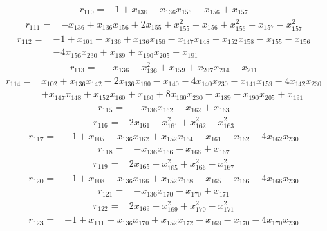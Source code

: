\[\begin{aligned}
r_{110}={}&1+x_{136}-x_{136}x_{156}-x_{156}+x_{157}
\end{aligned}\]
\[\begin{aligned}
r_{111}={}&-x_{136}+x_{136}x_{156}+2x_{155}+x_{155}^{2}-x_{156}+x_{156}^{2}-x_{157}-x_{157}^{2}
\end{aligned}\]
\[\begin{aligned}
r_{112}={}&-1+x_{101}-x_{136}+x_{136}x_{156}-x_{147}x_{148}+x_{152}x_{158}-x_{155}-x_{156}
\\ &-4x_{156}x_{230}+x_{189}+x_{190}x_{205}-x_{191}
\end{aligned}\]
\[\begin{aligned}
r_{113}={}&-x_{136}-x_{136}^{2}+x_{159}+x_{207}x_{214}-x_{211}
\end{aligned}\]
\[\begin{aligned}
r_{114}={}&x_{102}+x_{136}x_{142}-2x_{136}x_{160}-x_{140}-4x_{140}x_{230}-x_{141}x_{159}-4x_{142}x_{230}
\\ &+x_{147}x_{148}+x_{152}x_{160}+x_{160}+8x_{160}x_{230}-x_{189}-x_{190}x_{205}+x_{191}
\end{aligned}\]
\[\begin{aligned}
r_{115}={}&-x_{136}x_{162}-x_{162}+x_{163}
\end{aligned}\]
\[\begin{aligned}
r_{116}={}&2x_{161}+x_{161}^{2}+x_{162}^{2}-x_{163}^{2}
\end{aligned}\]
\[\begin{aligned}
r_{117}={}&-1+x_{105}+x_{136}x_{162}+x_{152}x_{164}-x_{161}-x_{162}-4x_{162}x_{230}
\end{aligned}\]
\[\begin{aligned}
r_{118}={}&-x_{136}x_{166}-x_{166}+x_{167}
\end{aligned}\]
\[\begin{aligned}
r_{119}={}&2x_{165}+x_{165}^{2}+x_{166}^{2}-x_{167}^{2}
\end{aligned}\]
\[\begin{aligned}
r_{120}={}&-1+x_{108}+x_{136}x_{166}+x_{152}x_{168}-x_{165}-x_{166}-4x_{166}x_{230}
\end{aligned}\]
\[\begin{aligned}
r_{121}={}&-x_{136}x_{170}-x_{170}+x_{171}
\end{aligned}\]
\[\begin{aligned}
r_{122}={}&2x_{169}+x_{169}^{2}+x_{170}^{2}-x_{171}^{2}
\end{aligned}\]
\[\begin{aligned}
r_{123}={}&-1+x_{111}+x_{136}x_{170}+x_{152}x_{172}-x_{169}-x_{170}-4x_{170}x_{230}
\end{aligned}\]
